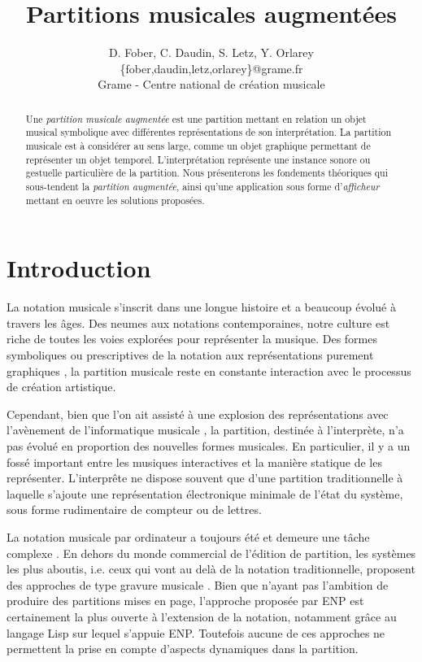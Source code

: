 \documentclass{article}
\title{Partitions musicales augmentées}
\author{D. Fober, C. Daudin, S. Letz, Y. Orlarey\\
{\small \{fober,daudin,letz,orlarey\}@grame.fr}\\
Grame - Centre national de création musicale
}
\begin{document}
%
\maketitle
%
\begin{abstract}
Une \emph{partition musicale augmentée} est une partition mettant en relation un objet musical symbolique avec différentes représentations de son interprétation. La partition musicale est à considérer au sens large, comme un objet graphique permettant de représenter un objet temporel. L'interprétation représente une instance sonore ou gestuelle particulière de la partition. Nous présenterons les fondements théoriques qui sous-tendent la \emph{partition augmentée}, ainsi qu'une application sous forme d'\emph{afficheur} mettant en oeuvre les solutions proposées.
\end{abstract}

\section{Introduction}\label{sec:introduction}

La notation musicale s'inscrit dans une longue histoire et a beaucoup évolué à travers les âges. Des neumes aux notations contemporaines, notre culture est riche de toutes les voies explorées pour représenter la musique. Des formes symboliques ou prescriptives de la notation aux représentations purement graphiques \cite{brown}, la partition musicale reste en constante interaction avec le processus de création artistique.

Cependant, bien que l'on ait assisté à une explosion des représentations avec l'avènement de l'informatique musicale  \cite{dann93b,selfridge-field97,hewlett01}, la partition, destinée à l'interprète, n'a pas évolué en proportion des nouvelles formes musicales. En particulier, il y a un fossé important entre les musiques interactives et la manière statique de les représenter. L'interprête ne dispose souvent que d'une partition traditionnelle à laquelle s'ajoute une représentation électronique minimale de l'état du système, sous forme rudimentaire de compteur ou de lettres.


La notation musicale par ordinateur a toujours été et demeure une tâche complexe \cite{BIRD84}. En dehors du monde commercial de l'édition de partition, les systèmes les plus aboutis, 
i.e. ceux qui vont au delà de la notation traditionnelle, proposent des approches de type gravure musicale \cite{Hamel98,lilypond03}. Bien que n'ayant pas l'ambition de produire des 
partitions mises en page, l'approche proposée par ENP \cite{KUUSK06} est certainement la plus ouverte à l'extension de la notation, notamment grâce au langage Lisp sur lequel s'appuie ENP. 
Toutefois aucune de ces approches ne permettent la prise en compte d'aspects dynamiques dans la partition.
\end{document}
